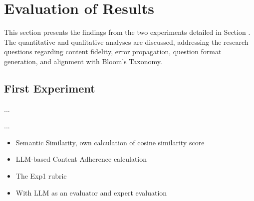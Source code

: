 \section{Evaluation of Results} \label{sec:evaluation}

This section presents the findings from the two experiments detailed in Section . The quantitative and qualitative analyses are discussed, addressing the research questions regarding content fidelity, error propagation, question format generation, and alignment with Bloom's Taxonomy.


\subsection{First Experiment}
\label{sec:first-experiment}

 ...



...


\begin{itemize}
    \item Semantic Similarity, own calculation of cosine similarity score
    \item LLM-based Content Adherence calculation
\end{itemize}


\begin{itemize}
    \item The Exp1 rubric
    \item With LLM as an evaluator and expert evaluation
\end{itemize}

